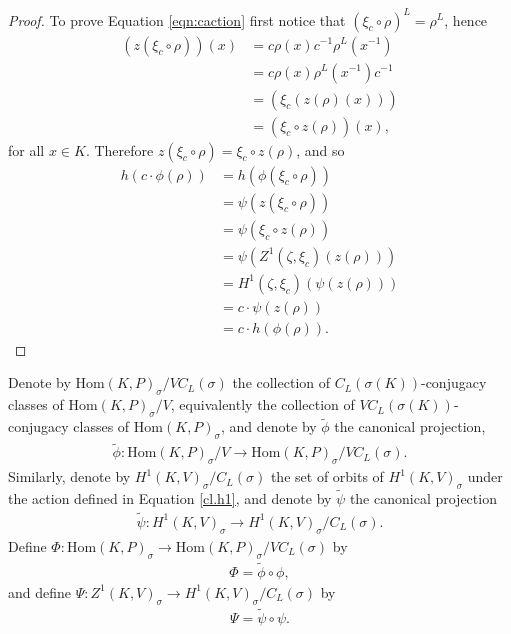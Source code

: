 \begin{proof}
		To prove Equation \ref{eqn:caction} first notice that $\left(\xi_c \circ \rho\right)^L = \rho^L$, hence
		\begin{align*}
			(z(\xi_c \circ \rho))(x) &= c\rho(x)c^{-1}\rho^L(x^{-1}) \\
				&= c\rho(x)\rho^L(x^{-1})c^{-1} \\
				&= \left(\xi_c ( z(\rho)(x))\right) \\
				&= (\xi_c \circ z(\rho))(x),
		\end{align*}
		for all $x \in K$. Therefore $z\left(\xi_c \circ \rho\right) = \xi_c\circ z(\rho)$, and so
		\begin{align*}
			h(c \cdot \phi(\rho)) &= h(\phi(\xi_c \circ \rho)) \\
			&= \psi(z(\xi_c\circ\rho)) \\
			&= \psi(\xi_c\circ z(\rho)) \\
			&= \psi\left(Z^1(\zeta, \xi_c)(z(\rho))\right) \\
			&= H^1(\zeta, \xi_c)(\psi(z(\rho))) \\
			&= c \cdot \psi(z(\rho)) \\
			&= c \cdot h(\phi(\rho)).
		\end{align*}
\end{proof}
	\begin{definition}
		Denote by $\mathrm{Hom}(K, P)_\sigma/VC_L(\sigma)$ the collection of $C_L(\sigma(K))$-conjugacy classes of $\mathrm{Hom}(K, P)_\sigma/V$, equivalently the collection of $VC_L(\sigma(K))$-conjugacy classes of $\mathrm{Hom}(K, P)_\sigma$, and denote by $\widetilde{\phi}$ the canonical projection,
		\begin{align*}
			\widetilde{\phi}: \mathrm{Hom}(K, P)_\sigma/V \rightarrow \mathrm{Hom}(K, P)_\sigma/VC_L(\sigma).
		\end{align*}
		Similarly, denote by $H^1(K, V)_\sigma/C_L(\sigma)$ the set of orbits of $H^1(K, V)_\sigma$ under the action defined in Equation \ref{cl.h1}, and denote by $\widetilde{\psi}$ the canonical projection
		\begin{align*}
			\widetilde{\psi}:H^1(K, V)_\sigma \rightarrow H^1(K, V)_\sigma/C_L(\sigma).
		\end{align*}
	Define $\Phi:\mathrm{Hom}(K, P)_\sigma \rightarrow \mathrm{Hom}(K, P)_\sigma/VC_L(\sigma)$ by
	\begin{align*}
		\Phi = \widetilde{\phi} \circ \phi,
	\end{align*}
	and define $\Psi:Z^1(K, V)_\sigma \rightarrow H^1(K, V)_\sigma/C_L(\sigma)$ by
	\begin{align*}
		\Psi = \widetilde{\psi} \circ \psi.
	\end{align*}
	\end{definition}

